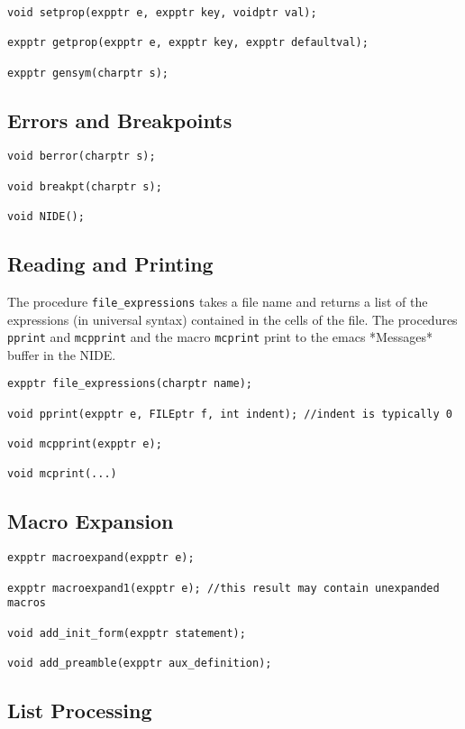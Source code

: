 \documentclass{article}
\begin{document}
\begin{verbatim}
void setprop(expptr e, expptr key, voidptr val);

expptr getprop(expptr e, expptr key, expptr defaultval);

expptr gensym(charptr s);
\end{verbatim}

\subsection{Errors and Breakpoints}

\begin{verbatim}
void berror(charptr s);

void breakpt(charptr s);

void NIDE();
\end{verbatim}

\subsection{Reading and Printing}
The procedure {\tt file\_expressions} takes a file name and returns a
list of the expressions (in universal syntax) contained in the cells
of the file.  The procedures {\tt pprint} and {\tt mcpprint} and the macro {\tt mcprint} print to the emacs *Messages* buffer in
the NIDE.

\begin{verbatim}
expptr file_expressions(charptr name);

void pprint(expptr e, FILEptr f, int indent); //indent is typically 0

void mcpprint(expptr e);

void mcprint(...)
\end{verbatim}

\subsection{Macro Expansion}

\begin{verbatim}
expptr macroexpand(expptr e);

expptr macroexpand1(expptr e); //this result may contain unexpanded macros

void add_init_form(expptr statement);

void add_preamble(expptr aux_definition);
\end{verbatim}

\subsection{List Processing}
\end{document}
